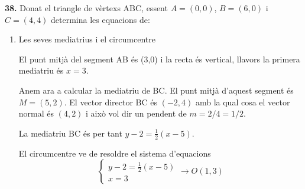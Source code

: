 \documentclass{book}
\begin{document}
\begin{mylist}
\begin{enumerate}
\begin{bluebox}
\begin{center}
			\end{center}
		\end{bluebox}
	
	\end{enumerate} 


\item[{\Large \bf 38.}] Donat el triangle de vèrtexs ABC, essent $A=(0,0)$, $B=(6,0)$ i $C=(4,4)$ determina les equacions de:


\begin{enumerate}
	\item Les seves mediatrius i el circumcentre
	
	\begin{bluebox}
		El punt mitjà del segment AB és (3,0) i la recta és vertical, llavors la primera mediatriu és $x=3$.
		
		Anem ara a calcular la mediatriu de BC. El punt mitjà d'aquest segment és $M=(5,2)$. El vector director BC és $(-2,4)$ amb la qual cosa el vector normal és $(4,2)$ i això vol dir un pendent de $m=2/4=1/2$.
		
		La mediatriu BC és per tant $y-2=\frac{1}{2}(x-5)$.
		
		El circumcentre ve de resoldre el sistema d'equacions
		\[ \left\{\begin{array}{l}  y-2=\frac{1}{2}(x-5) \\ x=3  \end{array} \right. \rightarrow  O(1,3)   \]
		

\end{bluebox}
\end{enumerate}
\end{mylist}
\end{document}
